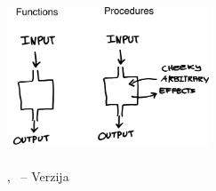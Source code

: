 \begin{titlepage}
    \begin{addmargin}[-1cm]{-3cm}
    \begin{center}
        \large

        \hfill

        \vfill

        \begingroup
            \color{Maroon}\spacedallcaps{\myTitle} \\ \bigskip
        \endgroup

        \spacedlowsmallcaps{\myAuthors}

        \vfill

        \includegraphics[width=6cm]{ext/frontpage.png} \\ %
		\vfill %
        \mySubtitle \\ %
        \vfill %
        \myMonth, \myYear\ -- Verzija \myVersion

        \vfill

    \end{center}
  \end{addmargin}
\end{titlepage}
